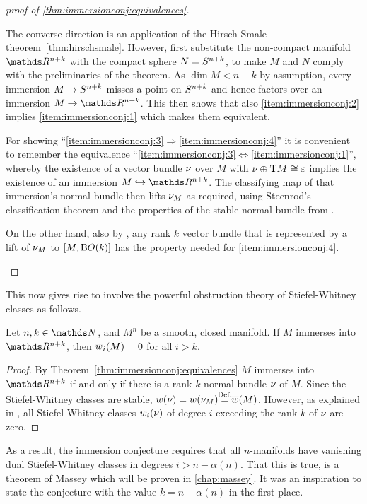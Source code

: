 \begin{proof}[proof of \autoref{thm:immersionconj:equivalences}]
\begin{description}
    The converse direction is an application of the Hirsch-Smale
    theorem~\autoref{thm:hirschsmale}.
    However, first substitute the non-compact manifold $\R^{n+k}$ with
    the compact sphere $N=S^{n+k}$, to make $M$ and $N$ comply
    with the preliminaries of the theorem. As $\dim M<n+k$ by assumption,
    every immersion $M\to S^{n+k}$ misses a point on
    $S^{n+k}$ and hence factors over an immersion $M\to\R^{n+k}$.
    This then shows that also \ref{item:immersionconj:2} implies
    \ref{item:immersionconj:1} which makes them equivalent.
  \item[\ref{item:immersionconj:3}$\Leftrightarrow$\ref{item:immersionconj:4}:]
    For showing
    \enquote{\ref{item:immersionconj:3}$\Rightarrow$\ref{item:immersionconj:4}}
    it is convenient to remember the equivalence
    \enquote{\ref{item:immersionconj:3}$\Leftrightarrow$\ref{item:immersionconj:1}},
    whereby the existence of a vector bundle $\nu_{}$ over $M$ with
    $\nu_{}\oplus\mathrm{T}M\cong\varepsilon$ implies the existence of an
    immersion $M\immto\R^{n+k}$.
    The classifying map of that immersion's normal bundle
    then lifts $\nu_{M}$ as required,
    using Steenrod's classification theorem
     and the properties
    of the stable normal bundle from
    .
    
    On the other hand, also by
    ,
    any rank $k$ vector bundle that is represented by a lift of
    $\nu_{M}$ to $[M,\mathrm{B}O(k)]$ has the property needed for
    \ref{item:immersionconj:4}.
    \qedhere
  \end{description}
\end{proof}

This now gives rise to involve the powerful obstruction theory of
Stiefel-Whitney classes as follows.
\begin{Cor}\label{cor:obstruction}
  Let $n,k\in\Nat$, and $M^n$ be a smooth, closed manifold.
  If $M$ immerses into $\R^{n+k}$, then ${\overline{w}_{i}}(M)=0$ for all
  $i>k$.
  \begin{proof}
    By Theorem~\autoref{thm:immersionconj:equivalences} $M$ immerses
    into $\R^{n+k}$ if and only if there is a rank-$k$
    normal bundle $\nu_{}$ of $M$.
    Since the Stiefel-Whitney classes are stable,
    $\W{\N{}}=\W{\N M}\cequalsby{Def.}\dualW{M}$.
    However, as explained in
    ,
    all Stiefel-Whitney classes ${w_{i}}(\nu_{})$ of degree $i$ exceeding
    the rank $k$ of $\nu_{}$ are zero.
  \end{proof}
\end{Cor}
As a result, the immersion conjecture requires that all $n$-manifolds
have vanishing dual Stiefel-Whitney classes in degrees $i>n-\alpha(n)$.
That this is true, is a theorem of Massey which will be proven in
\autoref{chap:massey}. It was an inspiration to state the conjecture
with the value $k=n-\alpha(n)$ in the first place.


